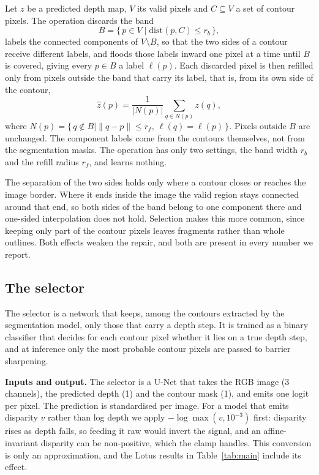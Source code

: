 \documentclass[conference]{IEEEtran}
\begin{document}
Let $z$ be a predicted depth map, $V$ its valid pixels and $C \subseteq V$ a set
of contour pixels. The operation discards the band
\begin{equation}
B = \{\, p \in V \mid \mathrm{dist}(p, C) \le r_b \,\},
\end{equation}
labels the connected components of $V \setminus B$, so that the two sides of a
contour receive different labels, and floods those labels inward one pixel at a
time until $B$ is covered, giving every $p \in B$ a label $\ell(p)$. Each
discarded pixel is then refilled only from pixels outside the band that carry its
label, that is, from its own side of the contour,
\begin{equation}
\hat z(p) = \frac{1}{|N(p)|} \sum_{q \in N(p)} z(q),
\end{equation}
where $N(p) = \{\, q \notin B \mid \|q - p\| \le r_f,\ \ell(q) = \ell(p) \,\}$.
Pixels outside $B$ are unchanged. The component labels come from the contours
themselves, not from the segmentation masks. The operation has only two
settings, the band width $r_b$ and the refill radius $r_f$, and learns nothing.

The separation of the two sides holds only where a contour closes or reaches the
image border. Where it ends inside the image the valid region stays connected
around that end, so both sides of the band belong to one component there and
one-sided interpolation does not hold. Selection makes this more common, since
keeping only part of the contour pixels leaves fragments rather than whole
outlines. Both effects weaken the repair, and both are present in every number
we report.

\subsection{The selector}
\label{sec:selector}

The selector is a network that keeps, among the contours extracted by the
segmentation model, only those that carry a depth step. It is trained as a binary
classifier that decides for each contour pixel whether it lies on a true depth
step, and at inference only the most probable contour pixels are passed to
barrier sharpening.

\textbf{Inputs and output.} The selector is a U-Net that takes the RGB image
(3 channels), the predicted depth (1) and the contour mask (1), and emits one
logit per pixel. The prediction is standardised per image. For a model that
emits disparity $v$ rather than log depth we apply $-\log\max(v, 10^{-3})$
first: disparity rises as depth falls, so feeding it raw would invert the
signal, and an affine-invariant disparity can be non-positive, which the clamp
handles. This conversion is only an approximation, and the Lotus
results in Table~\ref{tab:main} include its effect.
\end{document}
